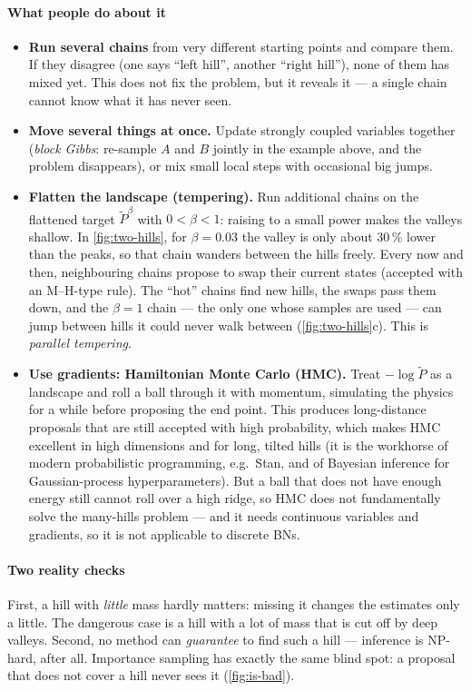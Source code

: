 \documentclass[11pt, oneside]{book}
\begin{document}
\paragraph{What people do about it}
\begin{itemize}
  \item \textbf{Run several chains} from very different starting points and
    compare them. If they disagree (one says ``left hill'', another ``right
    hill''), none of them has mixed yet. This does not fix the problem, but it
    reveals it --- a single chain cannot know what it has never seen.
  \item \textbf{Move several things at once.} Update strongly coupled
    variables together (\emph{block Gibbs}: re-sample $A$ and $B$ jointly in
    the example above, and the problem disappears), or mix small local steps
    with occasional big jumps.
  \item \textbf{Flatten the landscape (tempering).} Run additional chains on
    the flattened target $\tilde P^{\beta}$ with $0 < \beta < 1$: raising to a
    small power makes the valleys shallow. In \cref{fig:two-hills}, for
    $\beta = 0.03$ the valley is only about 30\,\% lower than the peaks, so
    that chain wanders between the hills freely. Every now and then,
    neighbouring chains propose to swap their current states (accepted with an
    M--H-type rule). The ``hot'' chains find new hills, the swaps pass them
    down, and the $\beta = 1$ chain --- the only one whose samples are used ---
    can jump between hills it could never walk between
    (\cref{fig:two-hills}c). This is \emph{parallel tempering}.
  \item \textbf{Use gradients: Hamiltonian Monte Carlo (HMC).} Treat
    $-\log \tilde P$ as a landscape and roll a ball through it with momentum,
    simulating the physics for a while before proposing the end point. This
    produces long-distance proposals that are still accepted with high
    probability, which makes HMC excellent in high dimensions and for long,
    tilted hills (it is the workhorse of modern probabilistic programming,
    e.g.\ Stan, and of Bayesian inference for Gaussian-process
    hyperparameters). But a ball that does not have enough energy still cannot
    roll over a high ridge, so HMC does not fundamentally solve the
    many-hills problem --- and it needs continuous variables and gradients, so
    it is not applicable to discrete BNs.
\end{itemize}

\paragraph{Two reality checks} First, a hill with \emph{little} mass hardly
matters: missing it changes the estimates only a little. The dangerous case is
a hill with a lot of mass that is cut off by deep valleys. Second, no method
can \emph{guarantee} to find such a hill --- inference is NP-hard, after all.
Importance sampling has exactly the same blind spot: a proposal that does not
cover a hill never sees it (\cref{fig:is-bad}).
\end{document}
